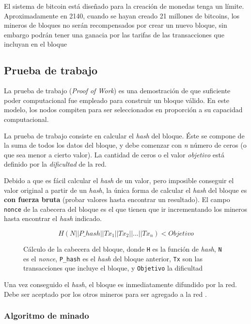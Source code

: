 El sistema de bitcoin está diseñado para la creación de monedas tenga un límite. Aproximadamente en 2140, cuando se hayan creado 21 millones de bitcoins, los mineros de bloques 
no serán recompensados por crear un nuevo bloque, sin embargo podrán tener una ganacia por las tarifas de las transacciones que incluyan en el bloque \autocite{MasteringBlockchainMining}

\subsection{Prueba de trabajo}

La prueba de trabajo (\emph{Proof of Work}) es una demostración de que suficiente poder computacional fue empleado para construir un bloque válido. En este modelo, los nodos compiten para ser seleccionados en proporción a su capacidad computacional.

La prueba de trabajo consiste en calcular el \emph{hash} del bloque. Éste se compone de la suma de todos los datos del bloque, y debe comenzar con \emph{n} número de ceros (o que sea menor a cierto valor). La cantidad de ceros o el valor \emph{objetivo} está definido por la \emph{dificultad} de la red.     

Debido a que es fácil calcular el \emph{hash} de un valor, pero imposible conseguir el valor original a partir de un \emph{hash}, la única forma de calcular el \emph{hash} del bloque es \textbf{con fuerza bruta} (probar valores hasta encontrar un resultado). El campo \texttt{nonce} de la cabecera del bloque es el que tienen que ir incrementando los mineros hasta encontrar el \emph{hash} indicado.

\begin{figure}[H]
    \centering
    \[ H(N || P\_hash|| Tx_1 || Tx_2 || ... || Tx_n) < Objetivo \]
    \caption*{Cálculo de la cabecera del bloque, donde \texttt{H} es la función de \emph{hash}, \texttt{N} es el \emph{nonce}, \texttt{P\_hash} es el \emph{hash} del bloque anterior, \texttt{Tx} son las transacciones que incluye el bloque, y \texttt{Objetivo} la dificultad}
\end{figure}

Una vez conseguido el \emph{hash}, el bloque es inmediatamente difundido por la red. Debe ser aceptado por los otros mineros para ser agregado a la red \autocite{MasteringBlockchainProofOfWork}. 

\subsubsection*{Algoritmo de minado}


